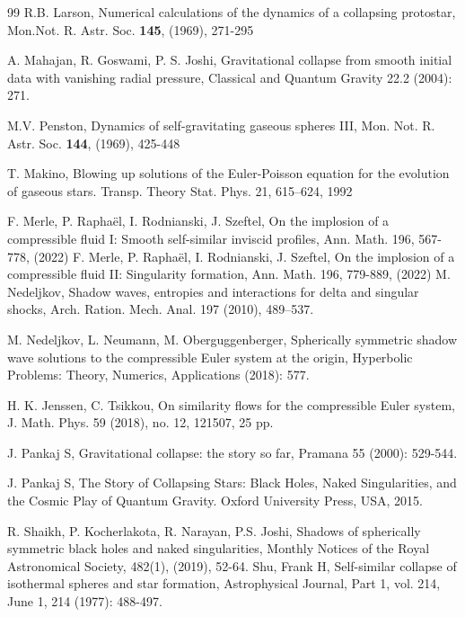 \documentclass[reqno]{article}%
\theoremstyle{plain}
\theoremstyle{definition}
\theoremstyle{remark}
\numberwithin{equation}{section}
\begin{document}
\begin{thebibliography}{99}
 R.B. Larson, Numerical calculations of the dynamics of a collapsing protostar, Mon.Not. R. Astr. Soc. {\bf 145}, (1969), 271-295 

 A. Mahajan, R. Goswami, P. S. Joshi, Gravitational collapse from smooth initial data with vanishing radial pressure, Classical and Quantum Gravity 22.2 (2004): 271.

 M.V. Penston, Dynamics of self-gravitating gaseous spheres III, Mon. Not. R. Astr. Soc. {\bf 144}, (1969), 425-448 

 T. Makino, Blowing up solutions of the Euler-Poisson equation for the evolution of
gaseous stars. Transp. Theory Stat. Phys. 21, 615–624, 1992

 F. Merle, P. Raphaël, I. Rodnianski, J. Szeftel,
On the implosion of a compressible fluid I: Smooth self-similar inviscid profiles, Ann. Math. 196,
567-778, (2022)
 F. Merle, P. Raphaël, I. Rodnianski, J. Szeftel, On the implosion of a compressible fluid II: Singularity formation, Ann. Math. 196, 779-889, (2022)
 M. Nedeljkov, Shadow waves, entropies and interactions for
delta and singular shocks, Arch. Ration. Mech. Anal. 197 (2010),
489--537.

 M. Nedeljkov, L. Neumann, M. Oberguggenberger, Spherically symmetric shadow wave solutions to the compressible Euler system
at the origin, Hyperbolic Problems: Theory, Numerics, Applications (2018): 577.

 H. K. Jenssen, C. Tsikkou, On similarity flows for the
compressible Euler system, J. Math. Phys. 59 (2018), no. 12, 121507, 25 pp.

 J. Pankaj S, Gravitational collapse: the story so far, Pramana 55 (2000): 529-544.

 J. Pankaj S, The Story of Collapsing Stars: Black Holes, Naked Singularities, and the Cosmic Play of Quantum Gravity. Oxford University Press, USA, 2015.

 R. Shaikh, P.  Kocherlakota, R. Narayan, P.S. Joshi, Shadows of spherically symmetric black holes and naked singularities, Monthly Notices of the Royal Astronomical Society, 482(1), (2019), 52-64.
 Shu, Frank H, Self-similar collapse of isothermal spheres and star formation, Astrophysical Journal, Part 1, vol. 214, June 1, 214 (1977): 488-497.





\end{thebibliography}


 
\end{document}
